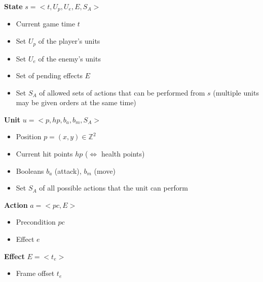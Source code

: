 \documentclass{beamer}
\newenvironment{framesubsec}{
    \begin{frame}{\subsecname}
}{\end{frame}}
\begin{document}
\begin{framesubsec}
    \begin{block}{\textbf{State} $s = <t,U_p,U_e,E,S_A>$}
        \begin{itemize}
        \item Current game time $t$ 
        \item Set $U_p$ of the player's units
        \item Set $U_e$ of the enemy's units
        \item Set of pending effects $E$
        \item Set $S_A$ of allowed sets of actions that can be performed from $s$ (multiple units may be given orders at the same time)
    \end{itemize}
    \end{block}

    \begin{block}{\textbf{Unit} $u = <p,hp,b_a,b_m,S_A>$}
        \begin{itemize}
        \item Position $p = (x,y) \in \mathbb{Z}^2$
        \item Current hit points $hp$ ($\Leftrightarrow$ health points)
        \item Booleans $b_a$ (attack), $b_m$ (move)
        \item Set $S_A$ of all possible actions that the unit can perform
        \end{itemize}
    \end{block}
\end{framesubsec}

\begin{framesubsec}
    \begin{block}{\textbf{Action} $a = <pc,E>$}
        \begin{itemize}
            \item Precondition $pc$
            \item Effect $e$
        \end{itemize}
    \end{block}

    \begin{block}{\textbf{Effect} $E = <t_e>$}
        \begin{itemize}
            \item Frame offset $t_e$
        \end{itemize}
    \end{block}
\end{framesubsec}
\end{document}
